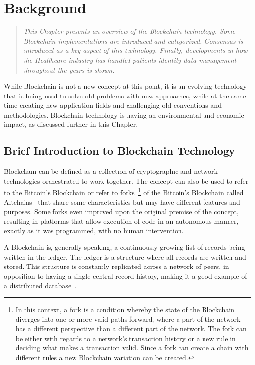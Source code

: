 \chapter{Background}\label{background}

\begin{quote} 
  \emph{This Chapter presents an overview of the Blockchain technology.  Some
  Blockchain implementations are introduced and categorized. Consensus is
  introduced as a key aspect of this technology. Finally, developments in how
  the Healthcare industry has handled patients identity data management
  throughout the years is shown.}
\end{quote}


While Blockchain is not a new concept at this point, it is an evolving
technology that is being used to solve old problems with new approaches, while
at the same time creating new application fields and challenging old
conventions and methodologies.  Blockchain technology is having an
environmental and economic impact, as discussed further in this Chapter.

\section{Brief Introduction to Blockchain Technology}

Blockchain can be defined as a collection of cryptographic and network
technologies orchestrated to work together. The concept can also be used to
refer to the Bitcoin's Blockchain or refer to forks~\footnote{In this context,
a fork is a condition whereby the state of the Blockchain diverges into one or
more valid paths forward, where a part of the network has a different
perspective than a different part of the network. The fork can be either with
regards to a network's transaction history or a new rule in deciding what makes
a transaction valid. Since a fork can create a chain with different rules a new
Blockchain variation can be created.} of the Bitcoin's Blockchain called
Altchains~\cite{Lewis2015} that share some characteristics but may have
different features and purposes. Some forks even improved upon the original
premise of the concept, resulting in platforms that allow execution of code in
an autonomous manner, exactly as it was programmed, with no human intervention.

A Blockchain is, generally speaking, a continuously growing list of records
being written in the ledger. The ledger is a structure where all records are
written and stored. This structure is constantly replicated across a network of
peers, in opposition to having a single central record history, making it a
good example of a distributed database~\cite{Barclay2017}.

